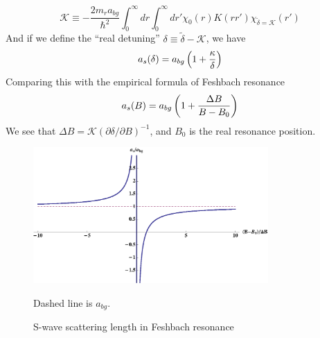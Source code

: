 \begin{equation}\label{eq:intro:kappa}
\mathcal{K}\equiv-\frac{2m_{r}a_{bg}}{\hbar^{2}}\int_{0}^{\infty}{dr}\int_{0}^{\infty}dr'\chi_{0}(r)K(rr')\chi_{\tilde\delta=\mathcal{K}}(r')
\end{equation}
And if we define the ``real detuning'' $\delta\equiv\tilde\delta-\mathcal{K}$, we have 
\begin{equation}
a_{s}(\delta)=a_{bg}\left(1+\frac{\kappa}{\delta}\right)
\end{equation}
Comparing this with the empirical formula of Feshbach resonance
\begin{equation}
a_{s}(B)=a_{bg}\left(1+\frac{\Delta{B}}{B-B_{0}}\right)
\end{equation}
We see that $\Delta{B}=\mathcal{K}(\partial\delta/\partial{B})^{-1}$, and $B_{0}$ is the real resonance position.  %
\begin{figure}[htbp]
\begin{center}
\includegraphics[width=0.8\textwidth]{FeshbachAs}
\caption{S-wave scattering length in Feshbach resonance} 
\label{fig:intro:Feshbach}
{\small Dashed line is $a_{bg}$.}
\end{center}
\end{figure}


